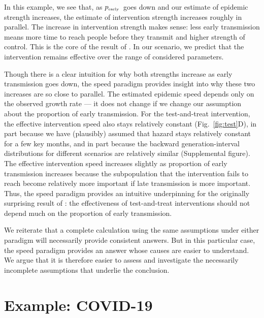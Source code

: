 \documentclass[12pt]{article}
\newcommand{\tsub}[2]{#1_{{\textrm{\tiny #2}}}}
\newcommand{\pEarly}{\ensuremath{\tsub{p}{early}}}
\newcommand{\figref}[1]{Fig.~\ref{fig:#1}}
\begin{document}
In this example, we see that, as \pEarly\ goes down and our estimate of epidemic strength increases, the estimate of intervention strength increases roughly in parallel. The increase in intervention strength makes sense: less early transmission means more time to reach people before they transmit and higher strength of control. This is the core of the result of \cite{eaton2014proportion}. 
In our scenario, we predict that the intervention remains effective over the range of considered parameters.

Though there is a clear intuition for why both strengths increase as early transmission goes down, the speed paradigm provides insight into why these two increases are so close to parallel.
The estimated epidemic speed depends only on the observed growth rate --- it does not change if we change our assumption about the proportion of early transmission.
For the test-and-treat intervention, the effective intervention speed also stays relatively constant (\figref{test}D), in part because we have (plausibly) assumed that hazard stays relatively constant for a few key months, and in part because the backward generation-interval distributions for different scenarios are relatively similar (Supplemental figure).
The effective intervention speed increases slightly as proportion of early transmission increases because the subpopulation that the intervention fails to reach become relatively more important if late transmission is more important.
Thus, the speed paradigm provides an intuitive underpinning for the originally surprising result of \cite{eaton2014proportion}: the effectiveness of test-and-treat interventions should not depend much on the proportion of early transmission.

We reiterate that a complete calculation using the same assumptions under either paradigm will necessarily provide consistent answers. But in this particular case, the speed paradigm provides an answer whose causes are easier to understand. We argue that it is therefore easier to assess and investigate the necessarily incomplete assumptions that underlie the conclusion.

\section{Example: COVID-19}
\end{document}
